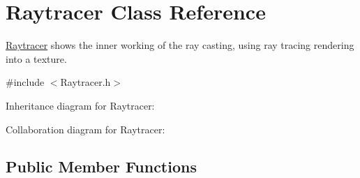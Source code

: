 \hypertarget{class_raytracer}{\section{Raytracer Class Reference}
\label{class_raytracer}
}


\hyperlink{class_raytracer}{Raytracer} shows the inner working of the ray casting, using ray tracing rendering into a texture.  




{\ttfamily \#include $<$Raytracer.\+h$>$}



Inheritance diagram for Raytracer\+:


Collaboration diagram for Raytracer\+:
\subsection*{Public Member Functions}
